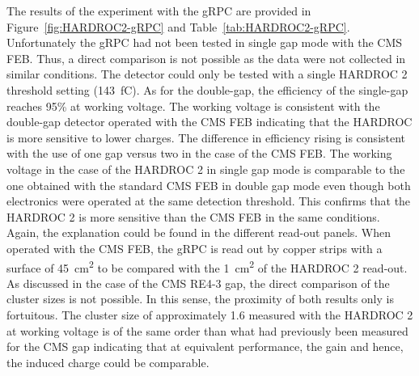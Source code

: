 	The results of the experiment with the gRPC are provided in Figure~\ref{fig:HARDROC2-gRPC} and Table~\ref{tab:HARDROC2-gRPC}. Unfortunately the gRPC had not been tested in single gap mode with the CMS FEB. Thus, a direct comparison is not possible as the data were not collected in similar conditions. The detector could only be tested with a single HARDROC 2 threshold setting (\SI{143}{fC}). As for the double-gap, the efficiency of the single-gap reaches 95\% at working voltage. The working voltage is consistent with the double-gap detector operated with the CMS FEB indicating that the HARDROC is more sensitive to lower charges. The difference in efficiency rising is consistent with the use of one gap versus two in the case of the CMS FEB. The working voltage in the case of the HARDROC 2 in single gap mode is comparable to the one obtained with the standard CMS FEB in double gap mode even though both electronics were operated at the same detection threshold. This confirms that the HARDROC 2 is more sensitive than the CMS FEB in the same conditions. Again, the explanation could be found in the different read-out panels. When operated with the CMS FEB, the gRPC is read out by copper strips with a surface of \SI{45}{cm^2} to be compared with the \SI{1}{cm^2} of the HARDROC 2 read-out.\\
	As discussed in the case of the CMS RE4-3 gap, the direct comparison of the cluster sizes is not possible. In this sense, the proximity of both results only is fortuitous. The cluster size of approximately 1.6 measured with the HARDROC 2 at working voltage is of the same order than what had previously been measured for the CMS gap indicating that at equivalent performance, the gain and hence, the induced charge could be comparable.
	
